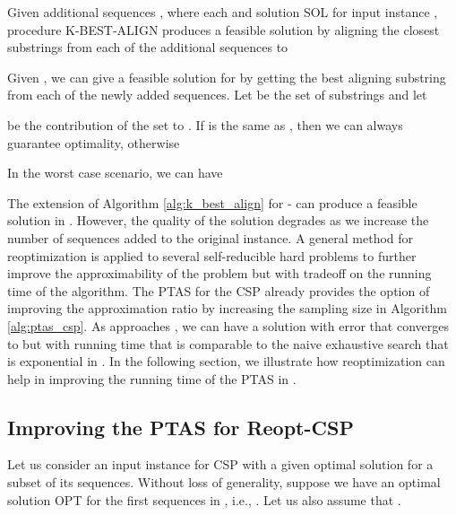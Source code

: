 \documentclass[journal]{acm_proc_article-sp}
\begin{document}
\begin{algorithm} 
\caption{Given  additional sequences , where each  and solution SOL for input instance , procedure K-BEST-ALIGN produces a feasible solution  by aligning the closest substrings from each of the additional sequences to }\label{alg:k_best_align}
\begin{algorithmic}[1]
\State{ }
\If{ }
\State{}
\State{}
\EndIf
\EndFor
\EndFor
\State{}
\EndProcedure
\end{algorithmic}
\end{algorithm}

Given , we can give a feasible solution for  by getting the best aligning substring  from each of the newly added sequences. Let  be the set of substrings  and let 

be the contribution of the set  to . If  is the same as , then we can always guarantee optimality, otherwise

In the worst case scenario, we can have

The extension of Algorithm \ref{alg:k_best_align} for - can produce a feasible solution in . However, the quality of the solution degrades as we increase the number of sequences added to the original instance. A general method for reoptimization is applied to several self-reducible hard problems to further improve the approximability of the problem but with tradeoff on the running time of the algorithm. The PTAS for the CSP already provides the option of improving the approximation ratio by increasing  the sampling size  in Algorithm \ref{alg:ptas_csp}. As  approaches ,  we can have a solution with error that converges to  but with running time that is comparable to the naive exhaustive search that is exponential in . In the following section, we illustrate how reoptimization can help in improving the running time of the PTAS in \cite{Li1999}.

\subsection{Improving the PTAS for Reopt-CSP}

Let us consider an input instance  for CSP with a given optimal solution for a subset of its sequences. Without loss of generality, suppose we have an optimal solution OPT for the first  sequences in , i.e., . Let us also assume that .
\end{document}
